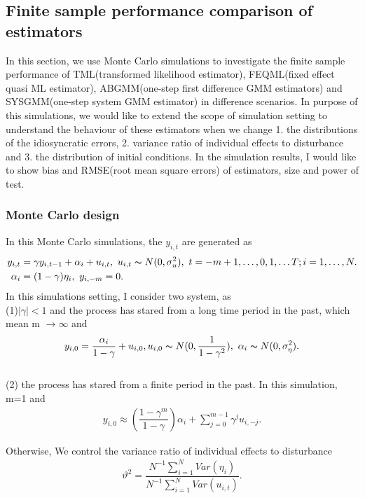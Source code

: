 \documentclass[12pt,a4paper,hyperref]{article}
\begin{document}
\subsection{Finite sample performance comparison of estimators}
In this section, we use Monte Carlo simulations to investigate the finite sample performance of TML(transformed likelihood estimator), FEQML(fixed effect quasi ML estimator), ABGMM(one-step first difference GMM estimators) and SYSGMM(one-step system GMM estimator) in difference scenarios. In purpose of this simulations, we would like to extend the scope of simulation setting to understand the behaviour of  these estimators when we  change 1. the distributions of the idiosyncratic errors, 2. variance ratio of individual effects to disturbance and 3. the distribution of initial conditions. In the simulation results, I would like to show bias and RMSE(root mean square errors) of estimators, size and power of test.
\subsubsection{Monte Carlo design}
In this Monte Carlo simulations, the $y_{i,t}$ are generated as
\begin{align*}
y_{i,t}&= \gamma y_{i,t-1}+\alpha_{i}+u_{i,t}, \,\, u_{i,t} \thicksim N(0,\sigma_{u}^{2}), \, \, t=-m+1,\ldots,0, 1,\ldots T; i=1,\ldots,N.\\
\alpha_{i} &=(1-\gamma)\eta_{i}, \,\,y_{i,-m}=0.
\end{align*}
In this simulations setting, I consider two system, as \\
(1)$|\gamma|<1$ and the process has stared from a long time period in the past, which mean m $\rightarrow \infty$ and
\begin{align*}
y_{i,0}=\dfrac{\alpha_{i}}{1-\gamma}+u_{i,0},  u_{i,0}\thicksim N(0,  \dfrac{1}{1-\gamma^{2}}), \,\, \alpha_{i} \thicksim N(0, \sigma_{\eta}^{2}).
\end{align*}
\\
(2) the process has stared from a finite period in the past. In this simulation, m=1 and
\begin{align*}
y_{i,0} \approx \left( \dfrac{1-\gamma^{m}}{1-\gamma} \right) \alpha_{i}+\sum^{m-1}_{j=0}\gamma^{j}u_{i,-j}.
\end{align*}

Otherwise, We control the variance ratio of individual effects to disturbance
\begin{align}
\vartheta^{2}=\dfrac{N^{-1}\sum^{N}_{i=1}Var(\eta_{i})}{N^{-1}\sum^{N}_{i=1}Var(u_{i,t})}.
\end{align}
\end{document}
